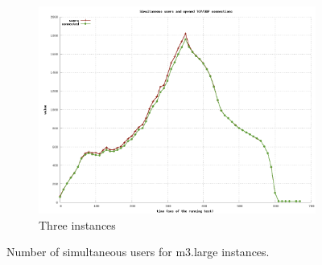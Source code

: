 \documentclass[dvips,12pt]{article}
\begin{document}
\begin{figure}[h!]
\begin{subfigure}[b]{0.3\textwidth}
        \includegraphics[width=\textwidth]{images/horizontal_m3large_dbm3large/sim_users_4.png}
        \caption{Three instances}
    \end{subfigure}
    \caption{Number of simultaneous users for m3.large instances.}
\end{figure}
\end{document}
